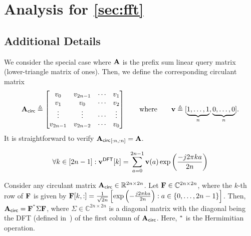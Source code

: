 \section{Analysis for \cref{sec:fft}}
\label{app:sfft-details}
\subsection{Additional Details}\label{app:ssec:fft-additional-definitions}

We consider the special case where $\mathbf{A}$ is the prefix sum linear query matrix (lower-triangle matrix of ones). Then, we define the corresponding circulant matrix
\begin{equation}
    \mathbf{A}_{\sf circ}\triangleq\begin{bmatrix}
        v_0 & v_{2n-1} & \cdots & v_1\\
        v_1 & v_0 & \cdots & v_2\\
        \vdots & \vdots & \cdots & \vdots\\
        v_{2n-1} & v_{2n-2} & \cdots & v_0
\end{bmatrix}
\qquad \text{where} \qquad
\mathbf{v} \triangleq [\underbrace{1,\ldots,1}_{n},\underbrace{0,\ldots,0}_{n}].
\label{eq:circRep}
\end{equation}
It is straightforward to verify ${\mathbf{A}_{\sf circ}}_{[:n, :n]} = \mathbf{A}$.

\begin{equation}
    \forall k\in[2n-1]: \mathbf{v}^{\sf DFT}[k]=\sum\limits_{a=0}^{2n-1}\mathbf{v}(a)\exp\left(\frac{-j2\pi k a}{2n}\right)
    \label{eq:DFT}
\end{equation}

\begin{thm}
    Consider any circulant matrix $\mathbf{A}_{\sf circ}\in\mathbb{R}^{2n\times 2n}$. Let $\mathbf{F}\in\mathbb{C}^{2n\times 2n}$, where the $k$-th row of $\mathbf{F}$ is given by  $\mathbf{F}[k,:]=\frac{1}{\sqrt{2n}}\left[\exp\left(-\frac{j2\pi ka}{2n}\right):a\in\{0,\ldots,2n-1\}\right]$. Then, $\mathbf{A}_{\sf circ}=\mathbf{F}^{^*}\Sigma\mathbf{F}$, where $\Sigma\in\mathbb{C}^{2n\times 2n}$ is a diagonal matrix with the diagonal being the DFT (defined in~) of the first column of $\mathbf{A}_{\sf circ}$. Here, $^*$ is the Hermimitian operation.
    \label{thm:circDiag}
\end{thm}

